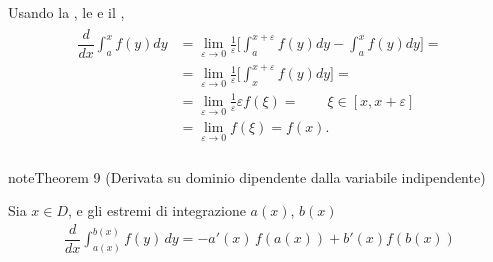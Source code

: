 \documentclass[letterpaper,10pt,english]{jupyterBook}
\begin{document}
\sphinxAtStartPar
{} Usando la {\hyperref[\detokenize{ch/infinitesimal_calculus/derivatives:infinitesimal-calculus-derivatives-def}]{}}, le {\hyperref[\detokenize{ch/infinitesimal_calculus/integrals:infinitesimal-calculus-integrals-def-definite-prop}]{}} e il {\hyperref[\detokenize{ch/infinitesimal_calculus/integrals:infinitesimal-calculus-integrals-thm-avg}]{}},
\begin{equation*}
\begin{split}\begin{aligned}
\dfrac{d}{dx} \int_{a}^x f(y) dy & = \lim_{\varepsilon \rightarrow 0 }\frac{1}{\varepsilon} \Big[ \int_{a}^{x+\varepsilon} f(y) dy - \int_{a}^{x} f(y) dy \Big] = \\
& = \lim_{\varepsilon \rightarrow 0 }\frac{1}{\varepsilon} \Big[ \int_{x}^{x+\varepsilon} f(y) dy \Big] = \\
& = \lim_{\varepsilon \rightarrow 0 } \frac{1}{\varepsilon} \varepsilon f(\xi) = \qquad \xi \in [x,x+\varepsilon] \\
& = \lim_{\varepsilon \rightarrow 0 } f(\xi) = f(x) . \\
\end{aligned}\end{split}
\end{equation*}\label{ch/infinitesimal_calculus/integrals:integrals:thm:fund:reynolds}
\begin{sphinxadmonition}{note}{Theorem 9 (Derivata su dominio dipendente dalla variabile indipendente)}



\sphinxAtStartPar
Sia \(x \in D\), e gli estremi di integrazione \(a(x)\), \(b(x)\)  
\begin{equation*}
\begin{split}\dfrac{d}{dx} \int_{a(x)}^{b(x)} f(y) \, dy = - a'(x) \, f(a(x)) + b'(x) f(b(x)) \end{split}
\end{equation*}\end{sphinxadmonition}
\end{document}

